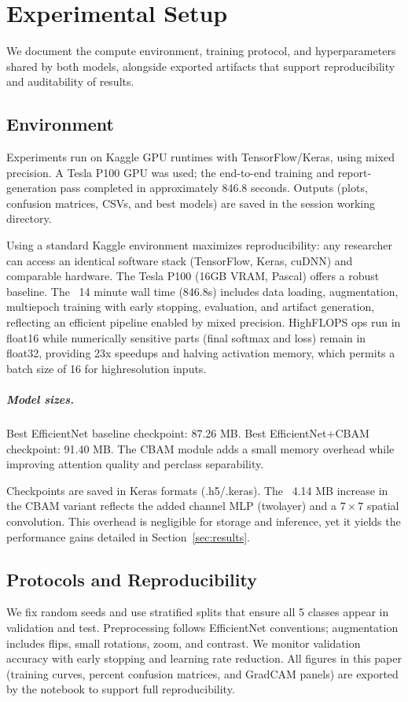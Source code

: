 \chapter{Experimental Setup}
We document the compute environment, training protocol, and hyperparameters shared by both models, alongside exported artifacts that support reproducibility and auditability of results.
\section{Environment}
Experiments run on Kaggle GPU runtimes with TensorFlow/Keras, using mixed precision. A Tesla P100 GPU was used; the end-to-end training and report-generation pass completed in approximately 846.8 seconds. Outputs (plots, confusion matrices, CSVs, and best models) are saved in the session working directory.

Using a standard Kaggle environment maximizes reproducibility: any researcher can access an identical software stack (TensorFlow, Keras, cuDNN) and comparable hardware. The Tesla P100 (16GB VRAM, Pascal) offers a robust baseline. The ~14 minute wall time (846.8s) includes data loading, augmentation, multi\textendash epoch training with early stopping, evaluation, and artifact generation, reflecting an efficient pipeline enabled by mixed precision. High\textendash FLOPS ops run in float16 while numerically sensitive parts (final softmax and loss) remain in float32, providing 2\textendash 3x speedups and halving activation memory, which permits a batch size of 16 for high\textendash resolution inputs.

\paragraph{Model sizes.} Best EfficientNet baseline checkpoint: 87.26 MB. Best EfficientNet+CBAM checkpoint: 91.40 MB. The CBAM module adds a small memory overhead while improving attention quality and per\textendash class separability.

Checkpoints are saved in Keras formats (.h5/.keras). The ~4.14 MB increase in the CBAM variant reflects the added channel MLP (two\textendash layer) and a $7\times7$ spatial convolution. This overhead is negligible for storage and inference, yet it yields the performance gains detailed in Section~\ref{sec:results}.

\section{Protocols and Reproducibility}
We fix random seeds and use stratified splits that ensure all 5 classes appear in validation and test. Preprocessing follows EfficientNet conventions; augmentation includes flips, small rotations, zoom, and contrast. We monitor validation accuracy with early stopping and learning rate reduction. All figures in this paper (training curves, percent confusion matrices, and Grad\textendash CAM panels) are exported by the notebook \cite{takrimNotebook} to support full reproducibility.

